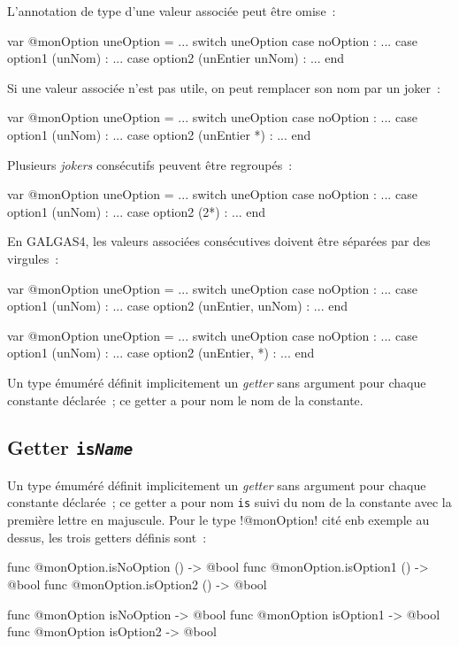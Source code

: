 L'annotation de type d'une valeur associée peut être omise~:

\begin{galgas3}
var @monOption uneOption = ...
switch uneOption
case noOption : ...
case option1 (unNom) : ...
case option2 (unEntier unNom) : ...
end
\end{galgas3}

Si une valeur associée n'est pas utile, on peut remplacer son nom par un joker~:
\begin{galgas3}
var @monOption uneOption = ...
switch uneOption
case noOption : ...
case option1 (unNom) : ...
case option2 (unEntier *) : ...
end
\end{galgas3}

Plusieurs \emph{jokers} consécutifs peuvent être regroupés~:

\begin{galgas3}
var @monOption uneOption = ...
switch uneOption
case noOption : ...
case option1 (unNom) : ...
case option2 (2*) : ...
end
\end{galgas3}

En GALGAS4, les valeurs associées consécutives doivent être séparées par des virgules~:

\begin{galgas4}
var @monOption uneOption = ...
switch uneOption
case noOption : ...
case option1 (unNom) : ...
case option2 (unEntier, unNom) : ...
end
\end{galgas4}

\begin{galgas4}
var @monOption uneOption = ...
switch uneOption
case noOption : ...
case option1 (unNom) : ...
case option2 (unEntier, *) : ...
end
\end{galgas4}







Un type émuméré définit implicitement un \emph{getter} sans argument pour chaque constante déclarée~; ce getter a pour nom le nom de la constante.

\subsection{Getter \texttt{is\emph{Name}}}

Un type émuméré définit implicitement un \emph{getter} sans argument pour chaque constante déclarée~; ce getter a pour nom \texttt{is} suivi du nom de la constante avec la première lettre en majuscule. Pour le type \ggsq!@monOption! cité enb exemple au dessus, les trois getters définis sont~:
\begin{galgas4}
func @monOption.isNoOption () -> @bool
func @monOption.isOption1 () -> @bool
func @monOption.isOption2 () -> @bool
\end{galgas4}
\begin{galgas3}
func @monOption isNoOption -> @bool
func @monOption isOption1 -> @bool
func @monOption isOption2 -> @bool
\end{galgas3}

